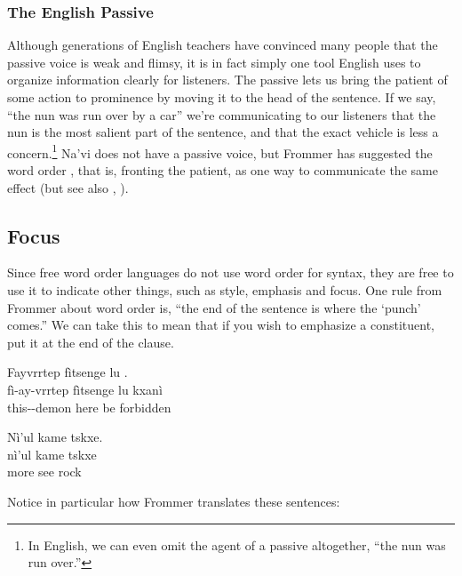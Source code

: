 \subsubsection{The English Passive} Although generations of English
teachers have convinced many people that the passive voice is weak and
flimsy, it is in fact simply one tool English uses to organize
information clearly for listeners.  The
passive lets us bring the patient of some action to prominence by
moving it to the head of the sentence.  If we say, ``the nun was run
over by a car'' we're communicating to our listeners that the nun is
the most salient part of the sentence, and that the exact vehicle is
less a concern.\footnote{In English, we can even omit the agent of a
passive altogether, ``the nun was run over.''}  Na'vi does not have a
passive voice, but Frommer has suggested the word order , that
is, fronting the patient, as one way to communicate the same effect
(but see also , ).



\subsection{Focus} 
Since free word order languages do not use word order for syntax, they
are free to use it to indicate other things, such as style, emphasis
and focus.  One rule from Frommer about word order is, ``the end of
the sentence is where the `punch' comes.''  We can take this to mean
that if you wish to emphasize a constituent, put it at the end of the
clause.

\begin{interlin}
\glll Fayvrrtep fìtsenge lu . \\
      fì-ay-vrrtep fìtsenge lu kxanì \\
      this--demon here be forbidden \\
\Ifilm
\end{interlin}

\begin{interlin}
\glll Nì'ul kame tskxe. \\
      nì'ul kame tskxe \\
      more see rock \\
\Ifilm
\end{interlin}

\noindent Notice in particular how Frommer translates these sentences:

